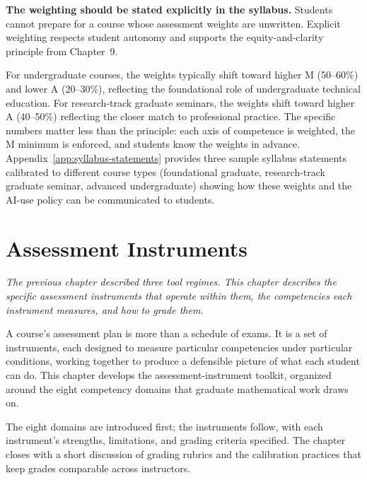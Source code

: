 \documentclass[11pt]{book}
\begin{document}
\textbf{The weighting should be stated explicitly in the syllabus.} Students cannot prepare for a course whose assessment weights are unwritten. Explicit weighting respects student autonomy and supports the equity-and-clarity principle from Chapter~9.

For undergraduate courses, the weights typically shift toward higher M (50--60\%) and lower A (20--30\%), reflecting the foundational role of undergraduate technical education. For research-track graduate seminars, the weights shift toward higher A (40--50\%) reflecting the closer match to professional practice. The specific numbers matter less than the principle: each axis of competence is weighted, the M minimum is enforced, and students know the weights in advance. Appendix~\ref{app:syllabus-statements} provides three sample syllabus statements calibrated to different course types (foundational graduate, research-track graduate seminar, advanced undergraduate) showing how these weights and the AI-use policy can be communicated to students.

\chapter{Assessment Instruments}
\label{ch:assessment-instruments}

\noindent \emph{The previous chapter described three tool regimes. This chapter describes the specific assessment instruments that operate within them, the competencies each instrument measures, and how to grade them.}

\medskip

A course's assessment plan is more than a schedule of exams. It is a set of instruments, each designed to measure particular competencies under particular conditions, working together to produce a defensible picture of what each student can do. This chapter develops the assessment-instrument toolkit, organized around the eight competency domains that graduate mathematical work draws on.

The eight domains are introduced first; the instruments follow, with each instrument's strengths, limitations, and grading criteria specified. The chapter closes with a short discussion of grading rubrics and the calibration practices that keep grades comparable across instructors.

\end{document}
